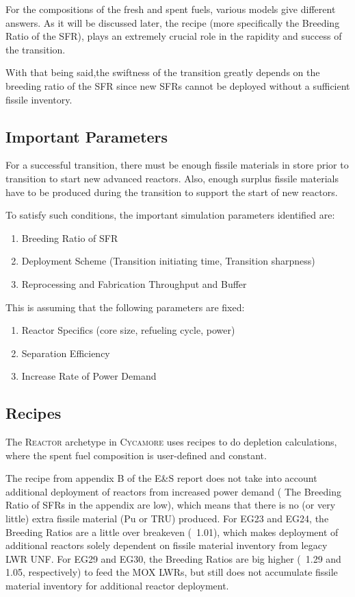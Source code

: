 \documentclass{article}
\newcommand{\Cycamore}{\textsc{Cycamore}\xspace}%
\begin{document}
For the compositions of the fresh and spent fuels, various models give different answers.
As it will be discussed later, the recipe (more specifically the Breeding Ratio of the \gls{SFR}),
plays an extremely crucial role in the rapidity and success of the transition. 

With that being said,the swiftness of the transition greatly depends on the 
breeding ratio of the \gls{SFR} since new \glspl{SFR} cannot be deployed 
without a sufficient fissile inventory. 

\subsection{Important Parameters}
For a successful transition, there must be enough fissile materials in store prior to transition
to start new advanced reactors. Also, enough surplus fissile materials have to be produced
during the transition to support the start of new reactors.

To satisfy such conditions, the important simulation parameters identified are:
\begin{enumerate}
	\item Breeding Ratio of \gls{SFR}
	\item Deployment Scheme (Transition initiating time, Transition sharpness)
	\item Reprocessing and Fabrication Throughput and Buffer
\end{enumerate}


This is assuming that the following parameters are fixed:
\begin{enumerate}
	\item Reactor Specifics (core size, refueling cycle, power)
	\item Separation Efficiency
	\item Increase Rate of Power Demand
\end{enumerate}

\subsection{Recipes}
The \textsc{Reactor}\xspace archetype in \Cycamore uses recipes to do depletion calculations,
where the spent fuel composition is user-defined and constant. 

The recipe from appendix B of the E\&S report does not take into account
additional deployment of reactors from increased power demand ( The Breeding Ratio
of \glspl{SFR} in the appendix are low), which means that there is no (or very little)
extra fissile material (Pu or TRU) produced. For EG23 and EG24, the Breeding Ratios are
a little over breakeven (~1.01), which makes deployment of additional reactors solely 
dependent on fissile material inventory from legacy LWR \gls{UNF}. For EG29 and EG30,
the Breeding Ratios are big higher (~1.29 and 1.05, respectively) to feed the
\gls{MOX} \glspl{LWR}, but still does not accumulate fissile material inventory for
additional reactor deployment.
\end{document}
